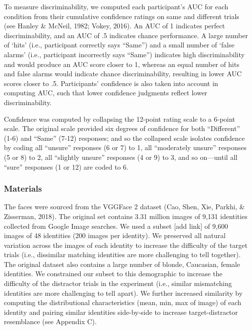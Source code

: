 \documentclass[
  english,
  man]{apa6}
\begin{document}
To measure discriminability, we computed each participant's AUC for each condition from their cumulative confidence ratings on same and different trials (see Hanley \& McNeil, 1982; Vokey, 2016). An AUC of 1 indicates perfect discriminability, and an AUC of .5 indicates chance performance. A large number of `hits' (i.e., participant correctly says ``Same'') and a small number of `false alarms' (i.e., participant incorrectly says ``Same'') indicates high discriminability and would produce an AUC score closer to 1, whereas an equal number of hits and false alarms would indicate chance discriminability, resulting in lower AUC scores closer to .5. Participants' confidence is also taken into account in computing AUC, such that lower confidence judgments reflect lower discriminability.

Confidence was computed by collapsing the 12-point rating scale to a 6-point scale. The original scale provided six degrees of confidence for both ``Different'' (1-6) and ``Same'' (7-12) responses; and so the collapsed scale isolates confidence by coding all ``unsure'' responses (6 or 7) to 1, all ``moderately unsure'' responses (5 or 8) to 2, all ``slightly unsure'' responses (4 or 9) to 3, and so on---until all ``sure'' responses (1 or 12) are coded to 6.

\hypertarget{materials}{%
\subsubsection{Materials}\label{materials}}

The faces were sourced from the VGGFace 2 dataset (Cao, Shen, Xie, Parkhi, \& Zisserman, 2018). The original set contains 3.31 million images of 9,131 identities collected from Google Image searches. We used a subset {[}add link{]} of 9,600 images of 48 identities (200 images per identity). We preserved all natural variation across the images of each identity to increase the difficulty of the target trials (i.e., dissimilar matching identities are more challenging to tell together). The original dataset also contains a large number of blonde, Caucasian, female identities. We constrained our subset to this demographic to increase the difficulty of the distractor trials in the experiment (i.e., similar mismatching identities are more challenging to tell apart). We further increased similarity by computing the distributional characteristics (mean, min, max of image) of each identity and pairing similar identities side-by-side to increase target-distractor resemblance (see Appendix C).
\end{document}
